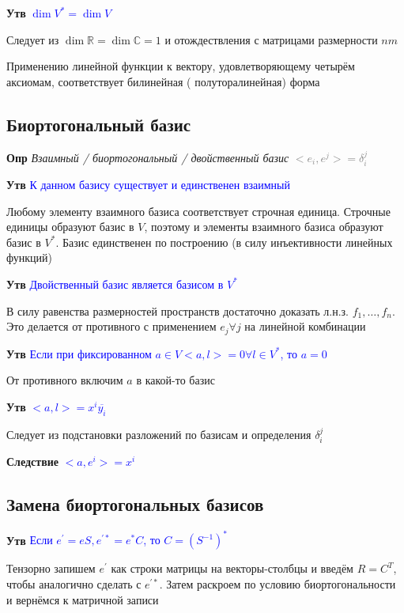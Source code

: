 \documentclass[a4paper, 14pt]{article}
\begin{document}
    \textbf{Утв} \textcolor{blue}{$\dim V^* = \dim V$}
    
    Следует из $\dim \mathbb{R} = \dim \mathbb{C} = 1$ и отождествления с матрицами размерности $nm$
    
    Применению линейной функции к вектору, удовлетворяющему четырём аксиомам, соответствует билинейная (
    полуторалинейная) форма
    
    \subsection{Биортогональный базис}
    
    \textbf{Опр} \textit{Взаимный / биортогональный / двойственный базис} \textcolor{gray}{$<e_i, e^j> = \delta_i^j$}
    
    \textbf{Утв} \textcolor{blue}{К данном базису существует и единственен взаимный}
    
    Любому элементу взаимного базиса соответствует строчная единица.
    Строчные единицы образуют базис в $V$, поэтому и элементы взаимного базиса образуют базис в $V^*$.
    Базис единственен по построению (в силу инъективности линейных функций)
    
    \textbf{Утв} \textcolor{blue}{Двойственный базис является базисом в $V^*$}
    
    В силу равенства размерностей пространств достаточно доказать л.н.з. $f_1, \dots, f_n$.
    Это делается от противного с применением $e_j \forall j$ на линейной комбинации
    
    \textbf{Утв} \textcolor{blue}{Если при фиксированном $a \in V <a, l> = 0 \forall l \in V^*$, то $a = 0$}
    
    От противного включим $a$ в какой-то базис
    
    \textbf{Утв} \textcolor{blue}{$<a, l> = x^i \overline{y_i}$}
    
    Следует из подстановки разложений по базисам и определения $\delta_i^j$
    
    \textbf{Следствие} \textcolor{blue}{$<a, e^i> = x^i$}
    
    \subsection{Замена биортогональных базисов}
    
    \textbf{Утв} \textcolor{blue}{Если $e^{'} = eS, e^{'*} = e^* C$, то $C = (S^{-1})^*$}
    
    Тензорно запишем $e^{'}$ как строки матрицы на векторы-столбцы и введём $R = C^T$, чтобы аналогично сделать с $e^{'*}$.
    Затем раскроем по условию биортогональности и вернёмся к матричной записи
    
\end{document}
